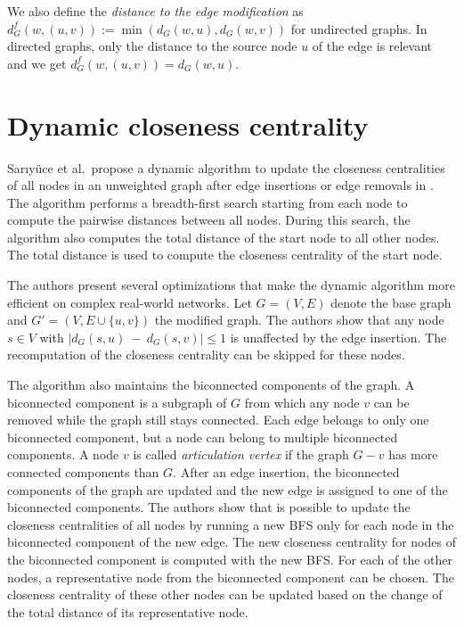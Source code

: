 We also define the \emph{distance to the edge modification} as $d_G^f(w, (u, v)) := \min{(d_G(w, u), d_G(w, v))}$ for undirected graphs. In directed graphs, only the distance to the source node $u$ of the edge is relevant and we get $d_G^f(w, (u, v)) = d_G(w, u)$.

\section{Dynamic closeness centrality}

Sar{\i}yüce et al.\ propose a dynamic algorithm to update the closeness centralities of all nodes in an unweighted graph after edge insertions or edge removals in \cite{sariyuce2013incremental}. The algorithm performs a breadth-first search starting from each node to compute the pairwise distances between all nodes. During this search, the algorithm also computes the total distance of the start node to all other nodes. The total distance is used to compute the closeness centrality of the start node. 

The authors present several optimizations that make the dynamic algorithm more efficient on complex real-world networks. Let $G = (V, E)$ denote the base graph and $G' = (V, E \cup \{u, v\})$ the modified graph. The authors show that any node $s \in V$ with $|d_G(s, u)~-~d_G(s, v)| \leq 1$ is unaffected by the edge insertion. The recomputation of the closeness centrality can be skipped for these nodes.

The algorithm also maintains the biconnected components of the graph. A biconnected component is a subgraph of $G$ from which any node $v$ can be removed while the graph still stays connected. Each edge belongs to only one biconnected component, but a node can belong to multiple biconnected components. A node $v$ is called \emph{articulation vertex} if the  graph $G - v$ has more connected components than $G$. After an edge insertion, the biconnected components of the graph are updated and the new edge is assigned to one of the biconnected components. The authors show that is possible to update the closeness centralities of all nodes by running a new BFS only for each node in the biconnected component of the new edge. The new closeness centrality for nodes of the biconnected component is computed with the new BFS. For each of the other nodes, a representative node from the biconnected component can be chosen. The closeness centrality of these other nodes can be updated based on the change of the total distance of its representative node.

